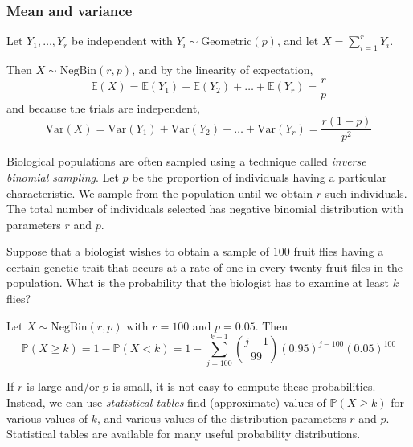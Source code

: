 \documentclass[lecture]{csm}
\newcommand{\prob}{\mathbb{P}}
\newcommand{\expe}{\mathbb{E}}
\newcommand{\var}{\text{Var}}
\begin{document}
\subsubsection*{Mean and variance}

\begin{hidebox}
Let $Y_1,\ldots,Y_r$ be independent with $Y_i\sim\text{Geometric}(p)$, and let $X = \sum_{i=1}^r Y_i$.
\par
Then $X\sim\text{NegBin}(r,p)$, and by the linearity of expectation,
\[
\expe(X) = \expe(Y_1)+\expe(Y_2)+\ldots+\expe(Y_r) = \frac{r}{p}
\]
and because the trials are independent,
\[
\var(X) = \var(Y_1)+\var(Y_2)+\ldots+\var(Y_r) = \frac{r(1-p)}{p^2}
\]
\vspace*{-4ex}
\end{hidebox}

\newpage

\begin{example}
Biological populations are often sampled using a technique called \emph{inverse binomial sampling}. Let $p$ be the proportion of individuals having a particular characteristic. We sample from the population until we obtain $r$ such individuals. The total number of individuals selected has negative binomial distribution with parameters $r$ and $p$. 

Suppose that a biologist wishes to obtain a sample of $100$ fruit flies having a certain genetic trait that occurs at a rate of one in every twenty fruit files in the population. What is the probability that the biologist has to examine at least $k$ flies?
\end{example}

\begin{solution}
Let $X\sim\text{NegBin}(r,p)$ with $r=100$ and $p=0.05$. Then
\[
\prob(X\geq k) = 1 - \prob(X < k) = 1 - \sum_{j=100}^{k-1} \binom{j-1}{99} (0.95)^{j-100}(0.05)^{100} 
\]
\end{solution}

\begin{remark}
If $r$ is large and/or $p$ is small, it is not easy to compute these probabilities. Instead, we can use \emph{statistical tables} find (approximate) values of $\prob(X\geq k)$ for various values of $k$, and various values of the distribution parameters $r$ and $p$. Statistical tables are available for many useful probability distributions. 
\end{remark}


\newpage
\end{document}
